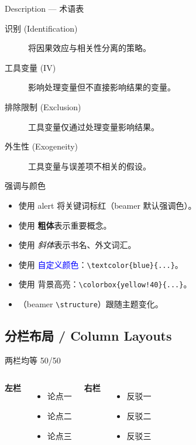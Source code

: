 \begin{frame}{Description — 术语表}
  \begin{description}
    \item[识别 (Identification)] 将因果效应与相关性分离的策略。
    \item[工具变量 (IV)] 影响处理变量但不直接影响结果的变量。
    \item[排除限制 (Exclusion)] 工具变量仅通过处理变量影响结果。
    \item[外生性 (Exogeneity)] 工具变量与误差项不相关的假设。
  \end{description}
\end{frame}

\begin{frame}{强调与颜色}
  \begin{itemize}
    \item 使用 \alert{alert} 将关键词标红（beamer 默认强调色）。
    \item 使用 \textbf{粗体}表示重要概念。
    \item 使用 \textit{斜体}表示书名、外文词汇。
    \item 使用 \textcolor{blue}{自定义颜色}：\texttt{\textbackslash textcolor\{blue\}\{...\}}。
    \item 使用 \colorbox{yellow!40}{背景高亮}：\texttt{\textbackslash colorbox\{yellow!40\}\{...\}}。
    \item {}（beamer \texttt{\textbackslash structure}）跟随主题变化。
  \end{itemize}
\end{frame}

\subsection{分栏布局 / Column Layouts}

\begin{frame}{两栏均等 50/50}
  \begin{columns}[T]
      \textbf{左栏}
      \begin{itemize}
        \item 论点一
        \item 论点二
        \item 论点三
      \end{itemize}
      \textbf{右栏}
      \begin{itemize}
        \item 反驳一
        \item 反驳二
        \item 反驳三
      \end{itemize}
  \end{columns}
\end{frame}

